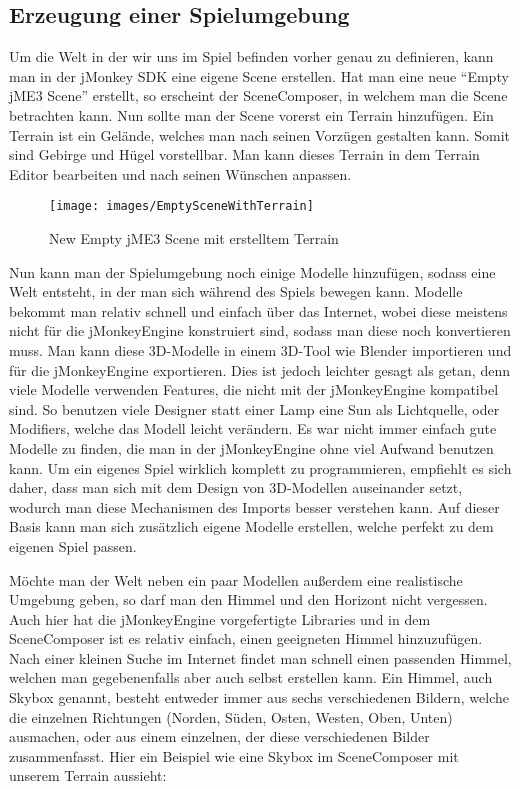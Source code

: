 \subsection{Erzeugung einer Spielumgebung}
Um die Welt in der wir uns im Spiel befinden vorher genau zu definieren, kann man in der jMonkey SDK eine eigene Scene erstellen. Hat man eine neue \enquote{Empty jME3 Scene} erstellt, so erscheint der SceneComposer, in welchem man die Scene betrachten kann. Nun sollte man der Scene vorerst ein Terrain hinzufügen. Ein Terrain ist ein Gelände, welches man nach seinen Vorzügen gestalten kann. Somit sind Gebirge und Hügel vorstellbar. Man kann dieses Terrain in dem Terrain Editor bearbeiten und nach seinen Wünschen anpassen. 
\begin{figure}[h!]
	
	\caption{New Empty jME3 Scene mit erstelltem Terrain}
	
	\centering\texttt{[image: images/EmptySceneWithTerrain]} 
	
\end{figure}
Nun kann man der Spielumgebung noch einige Modelle hinzufügen, sodass eine Welt entsteht, in der man sich während des Spiels bewegen kann. Modelle bekommt man relativ schnell und einfach über das Internet, wobei diese meistens nicht für die jMonkeyEngine konstruiert sind, sodass man diese noch konvertieren muss. Man kann diese 3D-Modelle in einem 3D-Tool wie Blender importieren und für die jMonkeyEngine exportieren. Dies ist jedoch leichter gesagt als getan, denn viele Modelle verwenden Features, die nicht mit der jMonkeyEngine kompatibel sind. So benutzen viele Designer statt einer Lamp eine Sun als Lichtquelle, oder Modifiers, welche das Modell leicht verändern. Es war nicht immer einfach gute Modelle zu finden, die man in der jMonkeyEngine ohne viel Aufwand benutzen kann. Um ein eigenes Spiel wirklich komplett zu programmieren, empfiehlt es sich daher, dass man sich mit dem Design von 3D-Modellen auseinander setzt, wodurch man diese Mechanismen des Imports besser verstehen kann. Auf dieser Basis kann man sich zusätzlich eigene Modelle erstellen, welche perfekt zu dem eigenen Spiel passen. 

Möchte man der Welt neben ein paar Modellen außerdem eine realistische Umgebung geben, so darf man den Himmel und den Horizont nicht vergessen. Auch hier hat die jMonkeyEngine vorgefertigte Libraries und in dem SceneComposer ist es relativ einfach, einen geeigneten Himmel hinzuzufügen. Nach einer kleinen Suche im Internet findet man schnell einen passenden Himmel, welchen man gegebenenfalls aber auch selbst erstellen kann. Ein Himmel, auch Skybox genannt, besteht entweder immer aus sechs verschiedenen Bildern, welche die einzelnen Richtungen (Norden, Süden, Osten, Westen, Oben, Unten) ausmachen, oder aus einem einzelnen, der diese verschiedenen Bilder zusammenfasst. Hier ein Beispiel wie eine Skybox im SceneComposer mit unserem Terrain aussieht:

